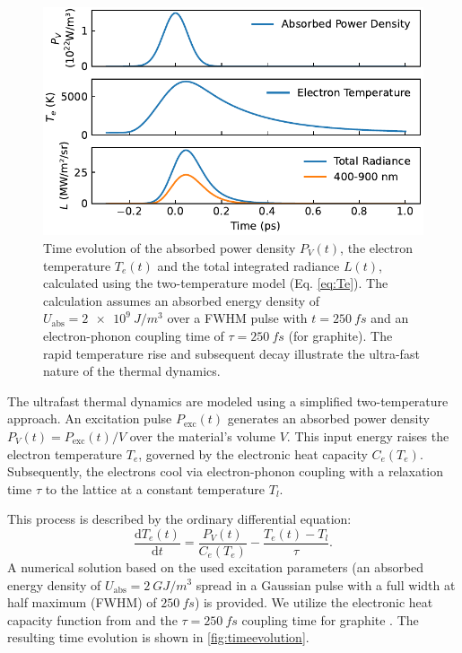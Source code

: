 \documentclass[
	a4paper,
]{scrarticle}
\begin{document}
\begin{figure}[b]
    \centering
    \includegraphics{../analysis/figures/model.time_evolution.pdf}
    \caption{Time evolution of the absorbed power density $P_V(t)$, the electron temperature $T_e(t)$ and the total integrated radiance $L(t)$, calculated using the two-temperature model (Eq. \ref{eq:Te}). The calculation assumes an absorbed energy density of $U_{\text{abs}} = \SI{2e9}{J/m^3}$ over a FWHM pulse with $t=\SI{250}{fs}$ and an electron-phonon coupling time of $\tau=\SI{250}{fs}$ (for graphite). The rapid temperature rise and subsequent decay illustrate the ultra-fast nature of the thermal dynamics.}
    \label{fig:timeevolution}
\end{figure}

The ultrafast thermal dynamics are modeled using a simplified two-temperature approach. An excitation pulse $P_{\text{exc}}(t)$ generates an absorbed power density $P_V(t) = P_{\text{exc}}(t) / V$ over the material's volume $V$. This input energy raises the electron temperature $T_e$, governed by the electronic heat capacity $C_e(T_e)$. Subsequently, the electrons cool via electron-phonon coupling with a relaxation time $\tau$ to the lattice at a constant temperature $T_l$.

This process is described by the ordinary differential equation:
\begin{equation}
    \frac{\mathrm d T_e(t)}{\mathrm d t}
    =
    \frac{P_V(t)}{C_e(T_e)}
    -\frac{T_e(t) - T_l}{\tau}.
    \label{eq:Te}
\end{equation}
A numerical solution based on the used excitation parameters (an absorbed energy density of $U_{\text{abs}} = \SI{2}{GJ/m^3}$ spread in a Gaussian pulse with a full width at half maximum (FWHM) of $\SI{250}{fs}$) is provided. We utilize the electronic heat capacity function from \cite{nihiraTemperatureDependenceLattice2003} and the $\tau=\SI{250}{fs}$ coupling time for graphite \cite{stangeHotElectronCooling2015}. The resulting time evolution is shown in \autoref{fig:timeevolution}.
\end{document}
